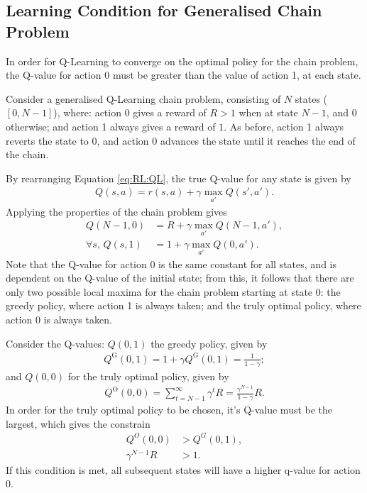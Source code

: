 \subsection{Learning Condition for Generalised Chain Problem}

In order for Q-Learning to converge on the optimal policy for the chain problem,
the Q-value for action 0 must be greater than the value of action 1, at each
state.

Consider a generalised Q-Learning chain problem, consisting of $N$ states
($[0,N-1]$), where:
action 0 gives a reward of $R > 1$ when at state $N-1$, and $0$ otherwise;
and action 1 always gives a reward of $1$.
As before, action 1 always reverts the state to 0, and action 0 advances the
state until it reaches the end of the chain.

By rearranging Equation \ref{eq:RL:QL}, the true Q-value for any state is given
by
\begin{align*}
    Q(s,a) = r(s,a) + \gamma\max_{a'}Q(s',a').
\end{align*}
Applying the properties of the chain problem gives
\begin{align*}
    Q(N-1,0) &= R + \gamma\max_{a'}Q(N-1,a'),\\
    \forall s,\, Q(s,1) &= 1 + \gamma\max_{a'}Q(0,a').
\end{align*}
Note that the Q-value for action 0 is the same constant for all states, and is
dependent on the Q-value of the initial state; from this, it follows that there
are only two possible local maxima for the chain problem starting at state 0:
the greedy policy, where action 1 is always taken;
and the truly optimal policy, where action 0 is always taken.

Consider the Q-values: $Q(0,1)$ the greedy policy, given by
\begin{align*}
    Q^\text{G}(0,1) = 1 + \gamma Q^\text{G}(0,1) = \frac{1}{1 - \gamma};
\end{align*}
and $Q(0,0)$ for the truly optimal policy, given by
\begin{align*}
    Q^\text{O}(0,0) = \sum_{t=N-1}^{\infty} \gamma^tR
    = \frac{\gamma^{N-1}}{1 - \gamma}R.
\end{align*}
In order for the truly optimal policy to be chosen, it's Q-value must be the
largest, which gives the constrain
\begin{align*}
    Q^O(0,0) &> Q^G(0,1),\\
    \gamma^{N-1}R &> 1.
\end{align*}
If this condition is met, all subsequent states will have a higher q-value for
action 0.


